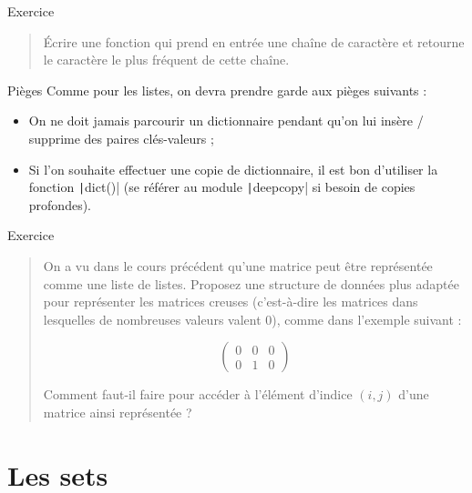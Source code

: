 \documentclass[10pt]{beamer}
\begin{document}
\begin{frame}{Exercice}
  \begin{quote}
    Écrire une fonction qui prend en entrée une chaîne de caractère et retourne le caractère le plus fréquent de cette chaîne.
  \end{quote}
\end{frame}

\begin{frame}[fragile]{Pièges}
  Comme pour les listes, on devra prendre garde aux pièges suivants :
  
  \begin{itemize}
    \item On ne doit \alert{jamais} parcourir un dictionnaire pendant qu'on lui insère / supprime des paires clés-valeurs ;
    \item Si l'on souhaite effectuer une copie de dictionnaire, il est bon d'utiliser la fonction \texttt|dict()| (se référer au module \texttt|deepcopy| si besoin de copies profondes).
  \end{itemize}
\end{frame}

\begin{frame}{Exercice}

  \begin{quote}
    On a vu dans le cours précédent qu'une matrice peut être représentée comme une liste de listes.
    Proposez une structure de données plus adaptée pour représenter les matrices creuses 
    (c'est-à-dire les matrices dans lesquelles de nombreuses valeurs valent 0), comme dans l'exemple suivant :

        $$
        \left(
          \begin{matrix}
            0 & 0 & 0 \\
            0 & 1 & 0
          \end{matrix}
        \right)
        $$

    Comment faut-il faire pour accéder à l'élément d'indice $(i, j)$ d'une matrice ainsi représentée ?
  \end{quote}
\end{frame}

\section{Les sets}
\end{document}
